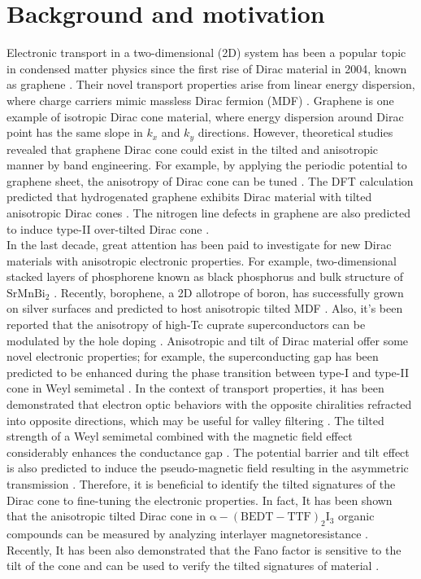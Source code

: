 \section{Background and motivation}
    Electronic transport in a two-dimensional (2D) system has been a popular topic in condensed matter physics since the first rise of Dirac material in 2004, known as graphene \cite{Zhang2004,Wehling2014}. 
    Their novel transport properties arise from linear energy dispersion, where charge carriers mimic massless Dirac fermion (MDF) \cite{CastroNeto2009}. 
    Graphene is one example of isotropic Dirac cone material, where energy dispersion around Dirac point has the same slope in $k_x$ and $k_y$ directions. 
    However, theoretical studies revealed that graphene Dirac cone could exist in the tilted and anisotropic manner by band engineering. 
    For example, by applying the periodic potential to graphene sheet, the anisotropy of Dirac cone can be tuned \cite{Park2008}. 
    The DFT calculation predicted that hydrogenated graphene exhibits Dirac material with tilted anisotropic Dirac cones \cite{Lu2016}. 
    The nitrogen line defects in graphene are also predicted to induce type-II over-tilted Dirac cone \cite{Zhang2017a}.\\

    In the last decade, great attention has been paid to investigate for new Dirac materials with anisotropic electronic properties. 
    For example, two-dimensional stacked layers of phosphorene known as black phosphorus \cite{Xia2014,Kim2015} and bulk structure of $\mathrm{SrMnBi_2}$ \cite{Park2011}. 
    Recently, borophene, a 2D allotrope of boron, has successfully grown on silver surfaces and predicted to host anisotropic tilted MDF \cite{Mannix2015a,Zhou2014}. 
    Also, it’s been reported that the anisotropy of high-Tc cuprate superconductors can be modulated by the hole doping \cite{Marino2019}.
    Anisotropic and tilt of Dirac material offer some novel electronic properties; for example, the superconducting gap has been predicted to be enhanced during the phase transition between type-I and type-II cone in Weyl semimetal \cite{Li2017a}. 
    In the context of transport properties, it has been demonstrated that electron optic behaviors with the opposite chiralities refracted into opposite directions, which may be useful for valley filtering \cite{Nguyen2018a}. 
    The tilted strength of a Weyl semimetal combined with the magnetic field effect considerably enhances the conductance gap \cite{Yesilyurt2017}. 
    The potential barrier and tilt effect is also predicted to induce the pseudo-magnetic field resulting in the asymmetric transmission \cite{Yesilyurt2017a}. 
    Therefore, it is beneficial to identify the tilted signatures of the Dirac cone to fine-tuning the electronic properties. 
    In fact, It has been shown that the anisotropic tilted Dirac cone in $\mathrm{\alpha-(BEDT-TTF)_2I_3}$ organic compounds can be measured by analyzing interlayer magnetoresistance \cite{Morinari2009}. 
    Recently, It has been also demonstrated that the Fano factor is sensitive to the tilt of the cone and can be used to verify the tilted signatures of material \cite{Trescher2015}.\\


